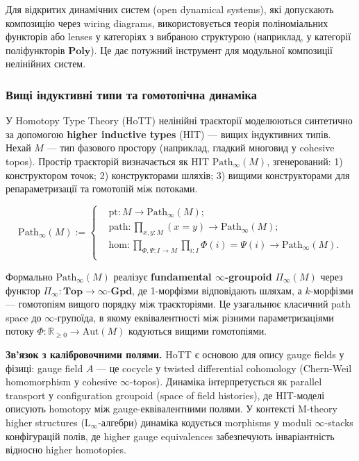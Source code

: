 \documentclass[a4paper,12pt]{article}
\begin{document}
Для відкритих динамічних систем (open dynamical systems), які допускають композицію через wiring diagrams, використовується теорія поліноміальних функторів або lenses у категоріях з вибраною структурою (наприклад, у категорії поліфункторів $\mathbf{Poly}$). Це дає потужний інструмент для модульної композиції нелінійних систем.

\subsubsection{Вищі індуктивні типи та гомотопічна динаміка}

У Homotopy Type Theory (HoTT) нелінійні траєкторії моделюються синтетично за
допомогою \textbf{higher inductive types} (HIT) — вищих індуктивних типів.
Нехай \( M \) --- тип фазового простору (наприклад, гладкий многовид у cohesive topos).
Простір траєкторій визначається як HIT \( \mathrm{Path}_\infty(M) \), згенерований:
1) конструктором точок; 2) конструкторами шляхів; 3) вищими конструкторами для репараметризації та гомотопій між потоками.

\[
\mathrm{Path}_\infty(M) :=
\left\{
\begin{aligned}
&\mathrm{pt} : M \to \mathrm{Path}_\infty(M);\\[4pt]
&\mathrm{path} : \prod_{x,y : M} (x = y) \to \mathrm{Path}_\infty(M);\\[6pt]
&\mathrm{hom} :
  \prod_{\Phi,\Psi : I \to M}
  \prod_{i : I} \Phi(i) = \Psi(i)
  \to \mathrm{Path}_\infty(M).\\[6pt]
\end{aligned}
\right.
\]

Формально \( \mathrm{Path}_\infty(M) \) реалізує \textbf{fundamental \(\infty\)-groupoid} \( \Pi_\infty(M) \) через функтор \( \Pi_\infty : \mathbf{Top} \to \infty\text{-}\mathbf{Gpd} \), де 1-морфізми відповідають шляхам, а \( k \)-морфізми --- гомотопіям вищого порядку між траєкторіями. Це узагальнює класичний path space до \(\infty\)-групоїда, в якому еквівалентності між різними параметризаціями потоку \( \Phi : \mathbb{R}_{\geq 0} \to \mathrm{Aut}(M) \) кодуються вищими гомотопіями.

\textbf{Зв’язок з калібровочними полями.} HoTT є основою для опису gauge fields у фізиці: gauge field \( A \) --- це cocycle у twisted differential cohomology (Chern-Weil homomorphism у cohesive \(\infty\)-topos). Динаміка інтерпретується як parallel transport у configuration groupoid (space of field histories), де HIT-моделі описують homotopy між gauge-еквівалентними полями. У контексті M-theory higher structures (L\(_\infty\)-алгебри) динаміка кодується morphisms у moduli \(\infty\)-stacks конфігурацій полів, де higher gauge equivalences забезпечують інваріантність відносно higher homotopies.
\end{document}
